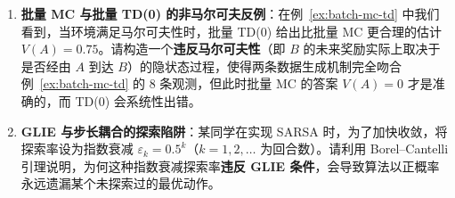 \begin{enumerate}
  \item[\textbf{6.1.5}] \textbf{批量 MC 与批量 TD(0) 的非马尔可夫反例}：在例~\ref{ex:batch-mc-td} 中我们看到，当环境满足马尔可夫性时，批量 TD(0) 给出比批量 MC 更合理的估计 $V(A) = 0.75$。请构造一个\textbf{违反马尔可夫性}（即 $B$ 的未来奖励实际上取决于是否经由 $A$ 到达 $B$）的隐状态过程，使得两条数据生成机制完全吻合例~\ref{ex:batch-mc-td} 的 8 条观测，但此时批量 MC 的答案 $V(A) = 0$ 才是准确的，而 TD(0) 会系统性出错。

  \item[\textbf{6.1.6}] \textbf{GLIE 与步长耦合的探索陷阱}：某同学在实现 SARSA 时，为了加快收敛，将探索率设为指数衰减 $\varepsilon_k = 0.5^k$（$k=1,2,\dots$ 为回合数）。请利用 Borel--Cantelli 引理说明，为何这种指数衰减探索率\textbf{违反 GLIE 条件}，会导致算法以正概率永远遗漏某个未探索过的最优动作。
\end{enumerate}


